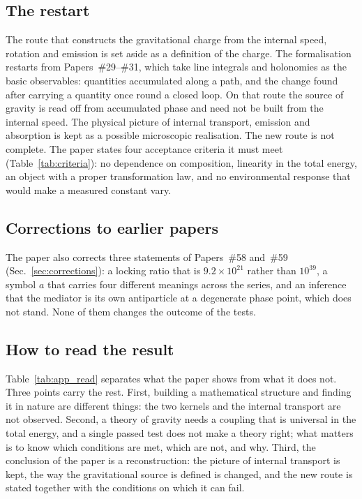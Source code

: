 \documentclass[%
 reprint, amsmath,amssymb, aps, prb, ]{revtex4-2}
\numberwithin{equation}{section}
\begin{document}
\subsection{The restart}

The route that constructs the gravitational charge from the internal speed, rotation and emission is set aside as a definition of the charge. The formalisation restarts from Papers~\#29--\#31, which take line integrals and holonomies as the basic observables: quantities accumulated along a path, and the change found after carrying a quantity once round a closed loop. On that route the source of gravity is read off from accumulated phase and need not be built from the internal speed. The physical picture of internal transport, emission and absorption is kept as a possible microscopic realisation. The new route is not complete. The paper states four acceptance criteria it must meet (Table~\ref{tab:criteria}): no dependence on composition, linearity in the total energy, an object with a proper transformation law, and no environmental response that would make a measured constant vary.

\subsection{Corrections to earlier papers}

The paper also corrects three statements of Papers~\#58 and~\#59 (Sec.~\ref{sec:corrections}): a locking ratio that is $9.2\times10^{21}$ rather than $10^{39}$, a symbol $a$ that carries four different meanings across the series, and an inference that the mediator is its own antiparticle at a degenerate phase point, which does not stand. None of them changes the outcome of the tests.

\subsection{How to read the result}

Table~\ref{tab:app_read} separates what the paper shows from what it does not. Three points carry the rest. First, building a mathematical structure and finding it in nature are different things: the two kernels and the internal transport are not observed. Second, a theory of gravity needs a coupling that is universal in the total energy, and a single passed test does not make a theory right; what matters is to know which conditions are met, which are not, and why. Third, the conclusion of the paper is a reconstruction: the picture of internal transport is kept, the way the gravitational source is defined is changed, and the new route is stated together with the conditions on which it can fail.
\end{document}
